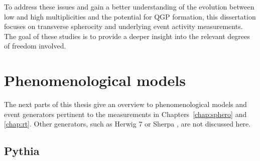 To address these issues and gain a better understanding of the evolution between low and high multiplicities and the potential for QGP formation, this dissertation focuses on transverse spherocity \SOPT and underlying event activity \RT measurements. The goal of these studies is to provide a deeper insight into the relevant degrees of freedom involved.



\section{Phenomenological models}

The next parts of this thesis give an overview to phenomenological models and event generators pertinent to the measurements in Chapters~\ref{chap:sphero} and \ref{chap:rt}. Other generators, such as Herwig 7 \cite{bellmHerwigReleaseNote2020} or Sherpa \cite{bothmannEventGenerationSherpa2019}, are not discussed here.

\subsection{Pythia}


